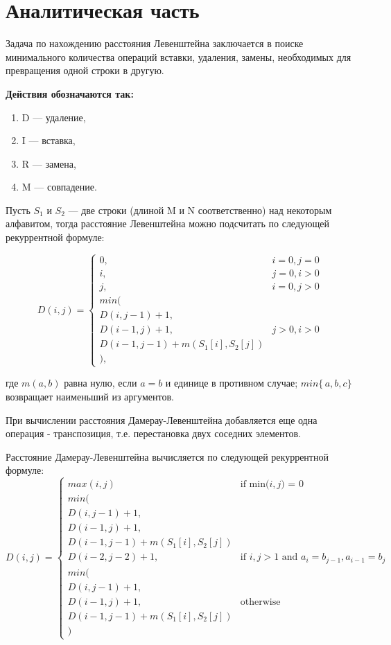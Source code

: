 \documentclass[12pt]{report}
\begin{document}
\chapter{Аналитическая часть}
Задача по нахождению расстояния Левенштейна заключается в поиске минимального количества операций вставки, удаления, замены, необходимых для превращения одной строки в другую.
 
\textbf{Действия обозначаются так:} 
\begin{enumerate}
  	\item D — удаление,
	\item I  — вставка,
	\item R  — замена,
	\item M — совпадение.
\end{enumerate}

Пусть $S_{1}$ и $S_{2}$ — две строки (длиной M и N соответственно) над некоторым алфавитом, тогда расстояние Левенштейна можно подсчитать по следующей рекуррентной формуле:

\begin{displaymath}
D(i,j) = \left\{ \begin{array}{ll}
 0, & \textrm{$i = 0, j = 0$}\\
 i, & \textrm{$j = 0, i > 0$}\\
 j, & \textrm{$i = 0, j > 0$}\\
min(\\
D(i,j-1)+1,\\
D(i-1, j) +1, &\textrm{$j>0, i>0$}\\
D(i-1, j-1) + m(S_{1}[i], S_{2}[j])\\
),
  \end{array} \right.
\end{displaymath}

где $m(a,b)$ равна нулю, если $a=b$ и единице в противном случае; $min\{\,a,b,c\}$ возвращает наименьший из аргументов.

При вычислении расстояния Дамерау-Левенштейна добавляется еще одна операция - транспозиция, т.е. перестановка двух соседних элементов.

Расстояние Дамерау-Левенштейна вычисляется по следующей рекуррентной формуле:
\begin{displaymath}
D(i,j) = \left\{ \begin{array}{ll}
max(i, j)&\textrm {if min($i,j$) = 0}\\
min(\\
D(i,j-1)+1,\\
D(i-1, j) +1,\\
D(i-1, j-1) + m(S_{1}[i], S_{2}[j])\\
D(i-2, j-2) + 1, &\textrm{if $i,j>1$ and $a_{i} = b_{j-1},a_{i-1}=b_{j} $}\\
min(\\
D(i,j-1)+1,\\
D(i-1, j) +1, &\textrm {otherwise}\\
D(i-1, j-1) + m(S_{1}[i], S_{2}[j])\\
)
  \end{array} \right.
\end{displaymath}
\end{document}
